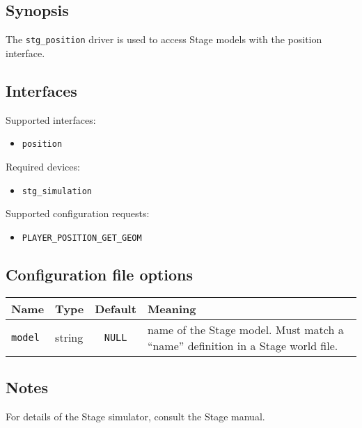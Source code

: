 \subsection*{Synopsis}

The {\tt stg\_position} driver is used to access Stage models with the
position interface.

\subsection*{Interfaces}

\noindent Supported interfaces:
\begin{itemize}
\item {\tt position}
\end{itemize}

\noindent Required devices:
\begin{itemize}
\item {\tt stg\_simulation}
\end{itemize}

\noindent Supported configuration requests:
\begin{itemize}
\item \verb+PLAYER_POSITION_GET_GEOM+
\end{itemize}


\subsection*{Configuration file options}

\begin{center}
{\small \begin{tabularx}{\columnwidth}{|l|l|c|X|}
\hline
Name & Type & Default & Meaning\\
\hline
{\tt model} & string & {\tt NULL} & name of the Stage model. Must match a ``name'' definition in a Stage world file. \\
\hline
\end{tabularx}}
\end{center}

\subsection*{Notes}

For details of the Stage simulator, consult the Stage manual.

